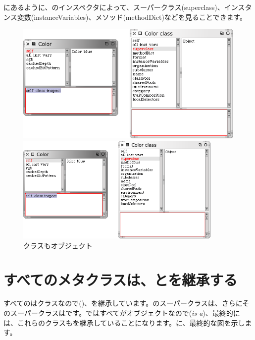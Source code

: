 \documentclass[a4paper,10pt,twoside]{book}
\begin{document}
にあるように、のインスペクタによって、スーパークラス(superclass)、インスタンス変数(instanceVariables)、メソッド(methodDict)などを見ることできます。

\begin{center}
\begin{figure}[!ht]
\ifluluelse
	{\centerline{\includegraphics[width=\textwidth]{InspectingColor}}}
	{\centerline{\includegraphics[width=10cm]{InspectingColor}}}
\caption{クラスもオブジェクト}
\end{figure}
\end{center}

\section{すべてのメタクラスは、とを継承する}

すべてのはクラスなので()、を継承しています。のスーパークラスは、さらにそのスーパークラスはです。\st ではすべてがオブジェクトなので(\emph{is-a})、最終的には、これらのクラスもを継承していることになります。に、最終的な図を示します。
\end{document}
